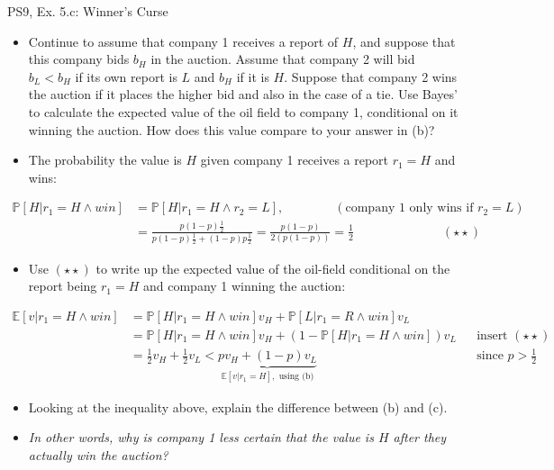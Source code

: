 \begin{frame}{PS9, Ex. 5.c: Winner's Curse}
      \begin{itemize}
        \item[(c)] Continue to assume that company 1 receives a report of $H$, and suppose that this company bids $b_H$ in the auction. Assume that company 2 will bid $b_L < b_H$ if its own report is $L$ and $b_H$ if it is $H$. Suppose that company 2 wins the auction if it places the higher bid and also in the case of a tie. Use Bayes’ to calculate the expected value of the oil field to company 1, conditional on it winning the auction. How does this value compare to your answer in (b)?
        \item[Step 1:] The probability the value is $H$ given company 1 receives a report $r_1=H$ and wins:
        \end{itemize}
        \vspace{-8pt}
        \begin{align*}
          \mathbb{P}[H|r_1=H\wedge win]&=\mathbb{P}[H|r_1=H\wedge r_2=L],\quad\quad\quad\quad(\text{company 1 only wins if }r_2=L)\\
            &=\frac{p(1-p)\frac{1}{2}}{p(1-p)\frac{1}{2}+(1-p)p\frac{1}{2}}=\frac{p(1-p)}{2(p(1-p))}=\frac{1}{2}\quad\quad\quad\quad\quad\quad\quad(\star\star)
        \end{align*}
        \vspace{-8pt}
        \begin{itemize}
        \item[Step 2:] Use $(\star\star)$ to write up the expected value of the oil-field conditional on the report being $r_1=H$ and company 1 winning the auction:
      \end{itemize}
      \vspace{-4pt}
      \begin{align*}
        \mathbb{E}[v|r_1=H\wedge win]&=\mathbb{P}[H|r_1=H\wedge win]v_H+\mathbb{P}[L|r_1=R\wedge win]v_L\\
        &=\mathbb{P}[H|r_1=H\wedge win]v_H+\left(1-\mathbb{P}[H|r_1=H\wedge win]\right)v_L&&\text{insert }(\star\star)\\
        &=\frac{1}{2}v_H+\frac{1}{2}v_L<\underbrace{pv_H+(1-p)v_L}_{\textstyle\mathbb{E}[v|r_1=H],\text{ using (b)}}&&\text{since }p>\frac{1}{2}
      \end{align*}
      \vspace{-10pt}
      \begin{itemize}
        \item[Step 3:] Looking at the inequality above, explain the difference between (b) and (c).
        \item[]        \textit{In other words, why is company 1 less certain that the value is $H$ after they actually win the auction?}
      \end{itemize}
      \vfill\null
\end{frame}
